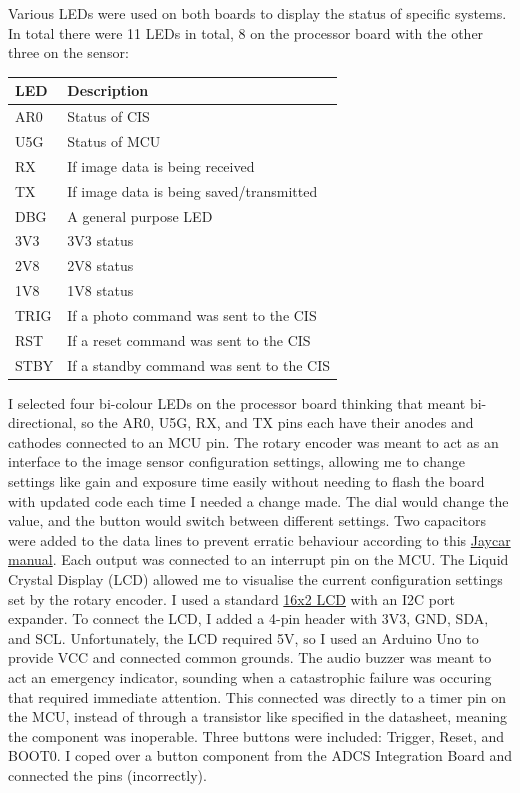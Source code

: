 Various LEDs were used on both boards to display the status of specific systems. In total there were 11 LEDs in total, 8 on the processor board with the other three on the sensor:

\begin{indentedtable}
    \centering
    \begin{tabular}{|l|l|}
    \hline
    \textbf{LED} & \textbf{Description} \\
    \hline
    AR0 & Status of CIS \\
    \hline
    U5G & Status of MCU \\
    \hline
    RX & If image data is being received \\
    \hline
    TX & If image data is being saved/transmitted \\
    \hline
    DBG & A general purpose LED \\
    \hline
    3V3 & 3V3 status \\
    \hline
    2V8 & 2V8 status \\
    \hline
    1V8 & 1V8 status \\
    \hline
    TRIG & If a photo command was sent to the CIS \\
    \hline
    RST & If a reset command was sent to the CIS \\
    \hline
    STBY & If a standby command was sent to the CIS \\
    \hline
    \end{tabular}
    \caption{C2Sv0.1 LEDs.}
\end{indentedtable}

I selected four bi-colour LEDs on the processor board thinking that meant bi-directional, so the AR0, U5G, RX, and TX pins each have their anodes and cathodes connected to an MCU pin.
\nl
The rotary encoder was meant to act as an interface to the image sensor configuration settings, allowing me to change settings like gain and exposure time easily without needing to flash the board with updated code each time I needed a change made. The dial would change the value, and the button would switch between different settings. Two capacitors were added to the data lines to prevent erratic behaviour according to this \href{https://media.jaycar.com.au/product/resources/SR1230_manualMain_94019.pdf}{Jaycar manual}. Each output was connected to an interrupt pin on the MCU.
\nl
The Liquid Crystal Display (LCD) allowed me to visualise the current configuration settings set by the rotary encoder. I used a standard \href{https://www.jaycar.com.au/dot-matrix-white-on-blue-lcd-16x2-character/p/QP5521}{16x2 LCD} with an I2C port expander. To connect the LCD, I added a 4-pin header with 3V3, GND, SDA, and SCL. Unfortunately, the LCD required 5V, so I used an Arduino Uno to provide VCC and connected common grounds.
\nl
The audio buzzer was meant to act an emergency indicator, sounding when a catastrophic failure was occuring that required immediate attention. This connected was directly to a timer pin on the MCU, instead of through a transistor like specified in the datasheet, meaning the component was inoperable. 
\nl
Three buttons were included: Trigger, Reset, and BOOT0. I coped over a button component from the ADCS Integration Board and connected the pins (incorrectly).

